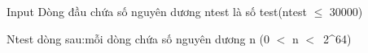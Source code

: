 Input
Dòng đầu chứa số nguyên dương ntest là số test(ntest $\le$ 30000)

Ntest dòng sau:mỗi dòng chứa số nguyên dương n (0 $<$ n $<$ 2^64)